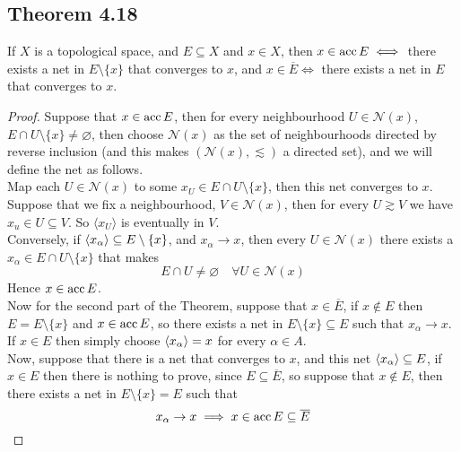 \documentclass[../../main.tex]{subfiles}
\begin{document}
\subsection{Theorem 4.18}
\begin{wts}
If $X$ is a topological space, and $E\subseteq X$ and $x\in X$, then $x\in\operatorname{acc}{E}\iff$ there exists a net in $E\setminus\{x\}$ that converges to $x$, and $x\in \overline{E}\iff$ there exists a net in $E$ that converges to $x$.
\end{wts}
\newcommand{\nx}{\mathcal{N}(x)} %
\begin{proof}
Suppose that $x\in\operatorname{acc}{E}$, then for every neighbourhood $U\in\mathcal{N}(x)$, $E\cap U\setminus\{x\}\neq\varnothing$, then choose $\mathcal{N}(x)$ as the set of neighbourhoods directed by reverse inclusion (and this makes $(\mathcal{N}(x),\lesssim)$ a directed set), and we will define the net as follows.\\

Map each $U\in \mathcal{N}(x)$ to some $x_U\in E\cap U\setminus\{x\}$, then this net converges to $x$. Suppose that we fix a neighbourhood, $V\in\nx$, then for every $U\gtrsim V$ we have $x_u\in U\subseteq V$. So $\langle x_U \rangle$ is eventually in $V$.\\

Conversely, if $\langle {x_\alpha} \rangle\subseteq E\setminus\{x\}$, and $x_\alpha\to x$, then every $U\in\nx$ there exists a $x_\alpha\in E\cap U\setminus\{x\}$ that makes
\[
E\cap U\neq \varnothing\quad \forall U\in\nx
\]
Hence $x\in\operatorname{acc}{E}$.\\

Now for the second part of the Theorem, suppose that $x\in\overline{E}$, if $x\notin E$ then $E = E\setminus\{x\}$ and $x\in\operatorname{acc}{E}$, so there exists a net in $E\setminus\{x\}\subseteq E$ such that $x_\alpha\to x$. If $x\in E$ then simply choose $\langle {x_\alpha} \rangle=x$ for every $\alpha\in A$.\\

Now, suppose that there is a net that converges to $x$, and this net $\langle {x_\alpha} \rangle\subseteq E$, if $x\in E$ then there is nothing to prove, since $E\subseteq\overline{E}$, so suppose that $x\notin E$, then there exists a net in $E\setminus\{x\}=E$ such that 
\[
x_\alpha\to x\implies x\in\operatorname{acc}{E}\subseteq\overline{E}
\]
\end{proof}
\end{document}
